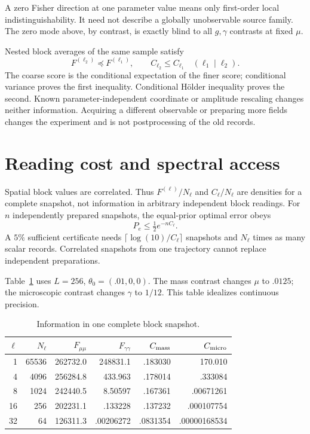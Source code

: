 \documentclass[12pt,a4paper]{article}
\begin{document}
A zero Fisher direction at one parameter value means only first-order
local indistinguishability. It need not describe a globally unobservable
source family. The zero mode above, by contrast, is exactly blind to all
$g,\gamma$ contrasts at fixed $\mu$.

Nested block averages of the same sample satisfy
\[
 F^{(\ell_2)}\preceq F^{(\ell_1)},\qquad
 C_{\ell_2}\leq C_{\ell_1}\quad(\ell_1\mid\ell_2).
\]
The coarse score is the conditional expectation of the finer score;
conditional variance proves the first inequality. Conditional
H\"older inequality proves the second. Known parameter-independent
coordinate or amplitude rescaling changes neither information.
Acquiring a different observable or preparing more fields changes the
experiment and is not postprocessing of the old records.

\section{Reading cost and spectral access}

Spatial block values are correlated. Thus $F^{(\ell)}/N_\ell$ and
$C_\ell/N_\ell$ are densities for a complete snapshot, not information
in arbitrary independent block readings. For $n$ independently
prepared snapshots, the equal-prior optimal error obeys
\begin{equation}
 P_e\leq\tfrac12 e^{-nC_\ell}.
 \label{eq:Pe}
\end{equation}
A $5\%$ sufficient certificate needs
$\lceil\log(10)/C_\ell\rceil$ snapshots and $N_\ell$ times as many scalar
records. Correlated snapshots from one trajectory cannot replace
independent preparations.

Table~\ref{tab:scale} uses $L=256$, $\theta_0=(.01,0,0)$.
The mass contrast changes $\mu$ to $.0125$; the microscopic contrast
changes $\gamma$ to $1/12$. This table idealizes continuous precision.
\begin{table}[ht]
\centering\small
\begin{tabular}{rrrrrr}
\toprule
$\ell$&$N_\ell$&$F_{\mu\mu}$&$F_{\gamma\gamma}$&
$C_{\rm mass}$&$C_{\rm micro}$\\
\midrule
1&65536&262732.0&248831.1&.183030&170.010\\
4&4096&256284.8&433.963&.178014&.333084\\
8&1024&242440.5&8.50597&.167361&.00671261\\
16&256&202231.1&.133228&.137232&.000107754\\
32&64&126311.3&.00206272&.0831354&.00000168534\\
\bottomrule
\end{tabular}
\caption{Information in one complete block snapshot.}\label{tab:scale}
\end{table}
\end{document}
